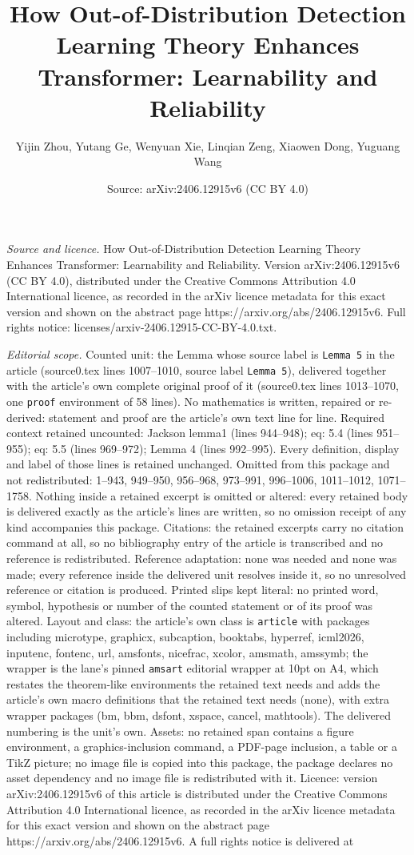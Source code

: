 \documentclass[10pt,a4paper]{amsart}
\title[How Out-of-Distribution Detection Learning Theory Enhances T]{How Out-of-Distribution Detection Learning Theory Enhances Transformer: Learnability and Reliability}
\author{Yijin Zhou, Yutang Ge, Wenyuan Xie, Linqian Zeng, Xiaowen Dong, Yuguang Wang}
\date{Source: arXiv:2406.12915v6 (CC BY 4.0)}
\begin{document}
\maketitle

\noindent\emph{Source and licence.} How Out-of-Distribution Detection Learning Theory Enhances Transformer: Learnability and Reliability. Version arXiv:2406.12915v6 (CC BY 4.0), distributed under the Creative Commons Attribution 4.0 International licence, as recorded in the arXiv licence metadata for this exact version and shown on the abstract page https://arxiv.org/abs/2406.12915v6. Full rights notice: licenses/arxiv-2406.12915-CC-BY-4.0.txt.\par\smallskip

\noindent\textit{Editorial scope.} Counted unit: the Lemma whose source label is \texttt{Lemma 5} in the article (source0.tex lines 1007--1010, source label \texttt{Lemma 5}), delivered together with the article's own complete original proof of it (source0.tex lines 1013--1070, one \texttt{proof} environment of 58 lines). No mathematics is written, repaired or re-derived: statement and proof are the article's own text line for line. Required context retained uncounted: Jackson lemma1 (lines 944--948); eq: 5.4 (lines 951--955); eq: 5.5 (lines 969--972); Lemma 4 (lines 992--995). Every definition, display and label of those lines is retained unchanged. Omitted from this package and not redistributed: 1--943, 949--950, 956--968, 973--991, 996--1006, 1011--1012, 1071--1758. Nothing inside a retained excerpt is omitted or altered: every retained body is delivered exactly as the article's lines are written, so no omission receipt of any kind accompanies this package. Citations: the retained excerpts carry no citation command at all, so no bibliography entry of the article is transcribed and no reference is redistributed. Reference adaptation: none was needed and none was made; every reference inside the delivered unit resolves inside it, so no unresolved reference or citation is produced. Printed slips kept literal: no printed word, symbol, hypothesis or number of the counted statement or of its proof was altered. Layout and class: the article's own class is \texttt{article} with packages including microtype, graphicx, subcaption, booktabs, hyperref, icml2026, inputenc, fontenc, url, amsfonts, nicefrac, xcolor, amsmath, amssymb; the wrapper is the lane's pinned \texttt{amsart} editorial wrapper at 10pt on A4, which restates the theorem-like environments the retained text needs and adds the article's own macro definitions that the retained text needs (none), with extra wrapper packages (bm, bbm, dsfont, xspace, cancel, mathtools). The delivered numbering is the unit's own. Assets: no retained span contains a figure environment, a graphics-inclusion command, a PDF-page inclusion, a table or a TikZ picture; no image file is copied into this package, the package declares no asset dependency and no image file is redistributed with it. Licence: version arXiv:2406.12915v6 of this article is distributed under the Creative Commons Attribution 4.0 International licence, as recorded in the arXiv licence metadata for this exact version and shown on the abstract page https://arxiv.org/abs/2406.12915v6. A full rights notice is delivered at 
\end{document}

